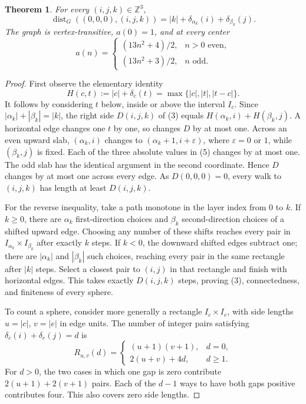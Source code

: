 \documentclass[10pt]{article}
\newtheorem{theorem}{Theorem}
\newcommand{\Z}{\mathbb Z}
\newcommand{\dist}{\operatorname{dist}}
\begin{document}
\begin{theorem}\label{main}
For every $(i,j,k)\in\Z^3$,
\[
 \dist_G((0,0,0),(i,j,k))
 =|k|+\delta_{\alpha_k}(i)+\delta_{\beta_k}(j).                 \tag{3}
\]
The graph is vertex-transitive, $a(0)=1$, and at every center
\[
 a(n)=\begin{cases}
 (13n^2+4)/2,&n>0\text{ even},\\
 (13n^2+3)/2,&n\text{ odd}.
 \end{cases}                                                    \tag{4}
\]
\end{theorem}
\begin{proof}
First observe the elementary identity
\[
 H(c,t):=|c|+\delta_c(t)=\max\{|c|,|t|,|t-c|\}.                \tag{5}
\]
It follows by considering $t$ below, inside or above the interval
$I_c$. Since $|\alpha_k|+|\beta_k|=|k|$, the right side $D(i,j,k)$
of (3) equals $H(\alpha_k,i)+H(\beta_k,j)$.
A horizontal edge changes one $t$ by one, so changes $D$ by at most
one. Across an even upward slab, $(\alpha_k,i)$ changes to
$(\alpha_k+1,i+\varepsilon)$, where $\varepsilon=0$ or $1$, while
$(\beta_k,j)$ is fixed. Each of the three absolute values in (5)
changes by at most one. The odd slab has the identical argument in
the second coordinate. Hence $D$ changes by at most one across every
edge. As $D(0,0,0)=0$, every walk to $(i,j,k)$ has length at least $D(i,j,k)$.

For the reverse inequality, take a path monotone in the layer index
from $0$ to $k$. If $k\geq0$, there are $\alpha_k$ first-direction
choices and $\beta_k$ second-direction choices of a shifted upward
edge. Choosing any number of these shifts reaches every pair in
$I_{\alpha_k}\times I_{\beta_k}$ after exactly $k$ steps. If $k<0$,
the downward shifted edges subtract one; there are $|\alpha_k|$ and
$|\beta_k|$ such choices, reaching every pair in the same rectangle
after $|k|$ steps. Select a closest pair to $(i,j)$ in that rectangle
and finish with horizontal edges. This takes exactly $D(i,j,k)$ steps,
proving (3), connectedness, and finiteness of every sphere.

To count a sphere, consider more generally a rectangle
$I_c\times I_e$, with side lengths $u=|c|$, $v=|e|$ in edge units.
The number of integer pairs satisfying
$\delta_c(i)+\delta_e(j)=d$ is
\[
 R_{u,v}(d)=\begin{cases}
 (u+1)(v+1),&d=0,\\
 2(u+v)+4d,&d\geq1.
 \end{cases}                                                    \tag{6}
\]
For $d>0$, the two cases in which one gap is zero contribute
$2(u+1)+2(v+1)$ pairs. Each of the $d-1$ ways to have both gaps
positive contributes four. This also covers zero side lengths.


\end{proof}
\end{document}
